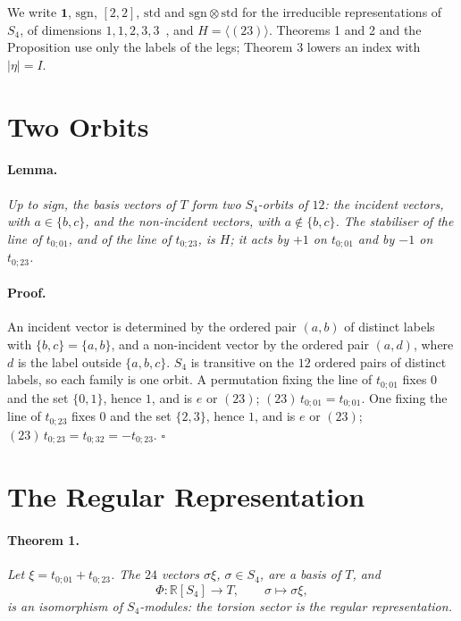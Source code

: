 \documentclass[twocolumn]{iopjournal}
\newcommand{\sgn}{\mathrm{sgn}}
\newcommand{\std}{\mathrm{std}}
\begin{document}
We write $\mathbf{1}$, $\sgn$, $[2,2]$, $\std$ and
$\sgn \otimes \std$ for the irreducible representations of $S_4$, of
dimensions $1, 1, 2, 3, 3$~\cite{FultonHarris}, and $H = \langle
(23) \rangle$. Theorems 1 and 2 and the Proposition use only the
labels of the legs; Theorem 3 lowers an index with $|\eta| = I$.


\section*{Two Orbits}

\paragraph{Lemma.} \textit{Up to sign, the basis vectors of $T$ form
two $S_4$-orbits of $12$: the incident vectors, with
$a \in \{b,c\}$, and the non-incident vectors, with
$a \notin \{b,c\}$. The stabiliser of the line of $t_{0;01}$, and of
the line of $t_{0;23}$, is $H$; it acts by $+1$ on $t_{0;01}$ and by
$-1$ on $t_{0;23}$.}

\paragraph{Proof.} An incident vector is determined by the ordered pair
$(a, b)$ of distinct labels with $\{b, c\} = \{a, b\}$, and a
non-incident vector by the ordered pair $(a, d)$, where $d$ is the
label outside $\{a, b, c\}$. $S_4$ is transitive on the $12$ ordered
pairs of distinct labels, so each family is one orbit. A permutation
fixing the line of $t_{0;01}$ fixes $0$ and the set $\{0,1\}$, hence
$1$, and is $e$ or $(23)$; $(23)\,t_{0;01} = t_{0;01}$. One fixing
the line of $t_{0;23}$ fixes $0$ and the set $\{2,3\}$, hence $1$,
and is $e$ or $(23)$; $(23)\,t_{0;23} = t_{0;32} = -t_{0;23}$.
\hfill $\square$


\section*{The Regular Representation}

\paragraph{Theorem 1.} \textit{Let
$\xi = t_{0;01} + t_{0;23}$. The $24$ vectors $\sigma\xi$,
$\sigma \in S_4$, are a basis of $T$, and}
\begin{equation}
  \Phi : \mathbb{R}[S_4] \to T, \qquad \sigma \mapsto \sigma\xi,
  \label{eq:Phi}
\end{equation}
\textit{is an isomorphism of $S_4$-modules: the torsion sector is
the regular representation.}
\end{document}
